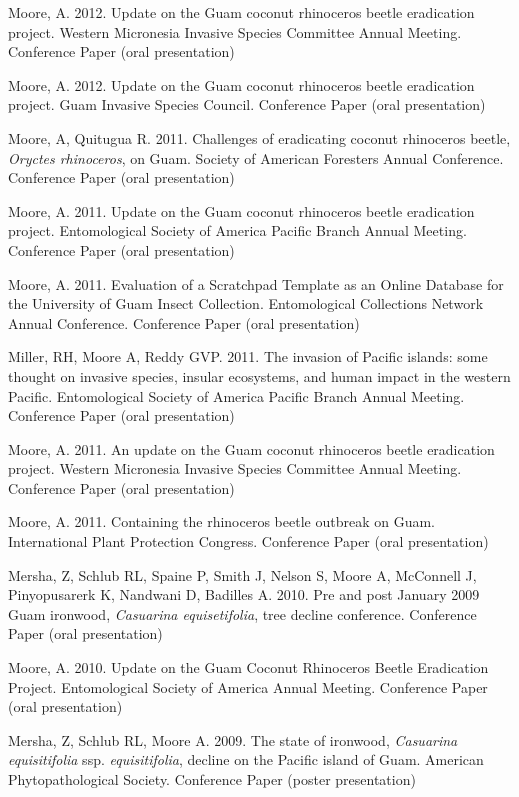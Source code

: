 \documentclass[12pt,english]{simplecv}
\begin{document}
\begin{thebibliography}{999}
Moore, A. 2012. Update on the Guam coconut rhinoceros
beetle eradication project. Western Micronesia Invasive Species Committee
Annual Meeting. Conference Paper (oral presentation)

Moore, A. 2012. Update on the Guam coconut rhinoceros
beetle eradication project. Guam Invasive Species Council. Conference
Paper (oral presentation)

Moore, A, Quitugua R. 2011. Challenges of eradicating
coconut rhinoceros beetle, \emph{Oryctes rhinoceros}, on Guam. Society
of American Foresters Annual Conference. Conference Paper (oral presentation)

Moore, A. 2011. Update on the Guam coconut rhinoceros
beetle eradication project. Entomological Society of America Pacific
Branch Annual Meeting. Conference Paper (oral presentation)

Moore, A. 2011. Evaluation of a Scratchpad Template
as an Online Database for the University of Guam Insect Collection.
Entomological Collections Network Annual Conference. Conference Paper
(oral presentation)

Miller, RH, Moore A, Reddy GVP. 2011. The invasion
of Pacific islands: some thought on invasive species, insular ecosystems,
and human impact in the western Pacific. Entomological Society of
America Pacific Branch Annual Meeting. Conference Paper (oral presentation)

Moore, A. 2011. An update on the Guam coconut rhinoceros
beetle eradication project. Western Micronesia Invasive Species Committee
Annual Meeting. Conference Paper (oral presentation)

Moore, A. 2011. Containing the rhinoceros beetle
outbreak on Guam. International Plant Protection Congress. Conference
Paper (oral presentation)

Mersha, Z, Schlub RL, Spaine P, Smith J, Nelson S,
Moore A, McConnell J, Pinyopusarerk K, Nandwani D, Badilles A. 2010. Pre
and post January 2009 Guam ironwood, \emph{Casuarina equisetifolia},
tree decline conference. Conference Paper (oral presentation)

Moore, A. 2010. Update on the Guam Coconut Rhinoceros
Beetle Eradication Project. Entomological Society of America Annual
Meeting. Conference Paper (oral presentation)

Mersha, Z, Schlub RL, Moore A. 2009. The state of
ironwood, \emph{Casuarina equisitifolia} ssp. \emph{equisitifolia},
decline on the Pacific island of Guam. American Phytopathological
Society. Conference Paper (poster presentation)


\end{thebibliography}
\end{document}

